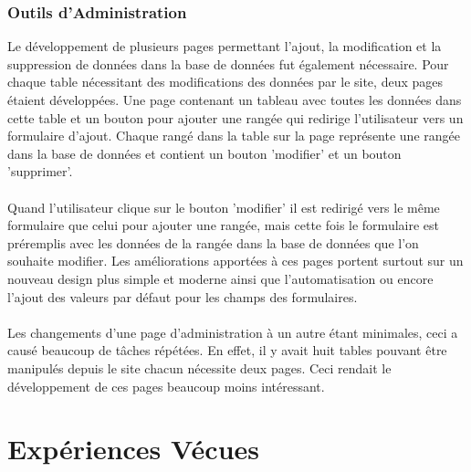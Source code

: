 \documentclass[11pt]{article}
\begin{document}
\subsubsection{Outils d'Administration}

Le développement de plusieurs pages permettant l'ajout, la modification et la suppression de données dans la base de données fut également nécessaire.
Pour chaque table nécessitant des modifications des données par le site, deux pages étaient développées.
Une page contenant un tableau avec toutes les données dans cette table et un bouton pour ajouter une rangée qui redirige l'utilisateur vers un formulaire d'ajout.
Chaque rangé dans la table sur la page représente une rangée dans la base de données et contient un bouton 'modifier' et un bouton 'supprimer'.\\
\\
Quand l'utilisateur clique sur le bouton 'modifier' il est redirigé vers le même formulaire que celui pour ajouter une rangée, mais cette fois le formulaire est préremplis avec les données de la rangée dans la base de données que l'on souhaite modifier.
Les améliorations apportées à ces pages portent surtout sur un nouveau design plus simple et moderne ainsi que l'automatisation ou encore l'ajout des valeurs par défaut pour les champs des formulaires.\\
\\
Les changements d'une page d'administration à un autre étant minimales, ceci a causé beaucoup de tâches répétées.
En effet, il y avait huit tables pouvant être manipulés depuis le site chacun nécessite deux pages.
Ceci rendait le développement de ces pages beaucoup moins intéressant.

\newpage

\section{Expériences Vécues}
\end{document}
